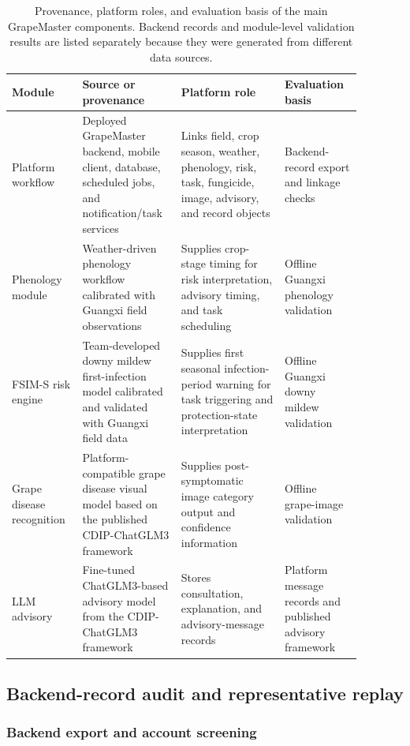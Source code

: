 \documentclass[12pt]{article}
\newcommand{\tablefontsize}{\fontsize{9pt}{11pt}\selectfont}
\begin{document}
\begin{table}[H]
\centering
\caption[Provenance and evaluation basis of GrapeMaster components]{Provenance, platform roles, and evaluation basis of the main GrapeMaster components. Backend records and module-level validation results are listed separately because they were generated from different data sources.}
\label{tab:module_provenance}
\tablefontsize
\begin{tabular}{@{}p{0.18\linewidth} p{0.23\linewidth} p{0.27\linewidth} p{0.20\linewidth}@{}}
\toprule
Module & Source or provenance & Platform role & Evaluation basis \\
\midrule
Platform workflow & Deployed GrapeMaster backend, mobile client, database, scheduled jobs, and notification/task services & Links field, crop season, weather, phenology, risk, task, fungicide, image, advisory, and record objects & Backend-record export and linkage checks \\
Phenology module & Weather-driven phenology workflow calibrated with Guangxi field observations & Supplies crop-stage timing for risk interpretation, advisory timing, and task scheduling & Offline Guangxi phenology validation \\
FSIM-S risk engine & Team-developed downy mildew first-infection model calibrated and validated with Guangxi field data & Supplies first seasonal infection-period warning for task triggering and protection-state interpretation & Offline Guangxi downy mildew validation \\
Grape disease recognition & Platform-compatible grape disease visual model based on the published CDIP-ChatGLM3 framework & Supplies post-symptomatic image category output and confidence information & Offline grape-image validation \\
LLM advisory & Fine-tuned ChatGLM3-based advisory model from the CDIP-ChatGLM3 framework & Stores consultation, explanation, and advisory-message records & Platform message records and published advisory framework \\
\bottomrule
\end{tabular}
\end{table}

\subsection{Backend-record audit and representative replay}\label{backend-record-audit-and-representative-replay}

\subsubsection{Backend export and account screening}\label{backend-export-and-account-screening}
\end{document}
